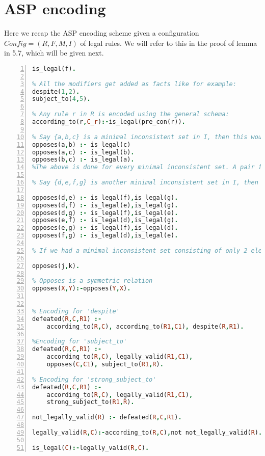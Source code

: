 \section{ASP encoding}
Here we recap the ASP encoding scheme given a configuration $Config = (R,F,M,I)$ of legal rules. We will refer to this in the proof of lemma in 5.7, which will be given next.
\begin{lstlisting}[language=Prolog, numbers=left]
% For any f in F, we have:
is_legal(f). 

% All the modifiers get added as facts like for example:
despite(1,2).
subject_to(4,5).

% Any rule r in R is encoded using the general schema:
according_to(r,C_r):-is_legal(pre_con(r)).

% Say {a,b,c} is a minimal inconsistent set in I, then this would get encoded as: 
opposes(a,b) :- is_legal(c)
opposes(a,c) :- is_legal(b).
opposes(b,c) :- is_legal(a).
%The above is done for every minimal inconsistent set. A pair from the set forms the opposes predicate and the rest of the elements go in the body 

% Say {d,e,f,g} is another minimal inconsistent set in I, then this would get encoded as:

opposes(d,e) :- is_legal(f),is_legal(g).
opposes(d,f) :- is_legal(e),is_legal(g).
opposes(d,g) :- is_legal(f),is_legal(e).
opposes(e,f) :- is_legal(d),is_legal(g).
opposes(e,g) :- is_legal(f),is_legal(d).
opposes(f,g) :- is_legal(d),is_legal(e).

% If we had a minimal inconsistent set consisting of only 2 elements say {j,k}, this would get encoded as:

opposes(j,k).

% Opposes is a symmetric relation
opposes(X,Y):-opposes(Y,X).


% Encoding for 'despite'
defeated(R,C,R1) :-
    according_to(R,C), according_to(R1,C1), despite(R,R1).

%Encoding for 'subject_to'
defeated(R,C,R1) :-
    according_to(R,C), legally_valid(R1,C1),
    opposes(C,C1), subject_to(R1,R).

% Encoding for 'strong_subject_to'
defeated(R,C,R1) :-
    according_to(R,C), legally_valid(R1,C1),
    strong_subject_to(R1,R).

not_legally_valid(R) :- defeated(R,C,R1).

legally_valid(R,C):-according_to(R,C),not not_legally_valid(R).

is_legal(C):-legally_valid(R,C).
\end{lstlisting}




